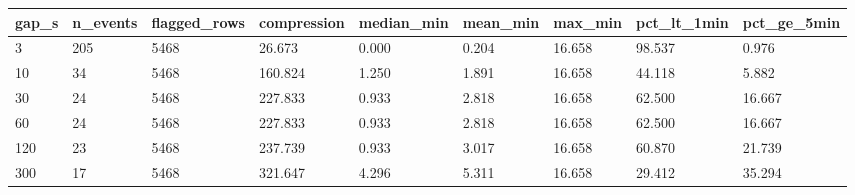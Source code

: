 \begin{tabular}{lllllllll}
\toprule
gap\_s & n\_events & flagged\_rows & compression & median\_min & mean\_min & max\_min & pct\_lt\_1min & pct\_ge\_5min \\
\midrule
3 & 205 & 5468 & 26.673 & 0.000 & 0.204 & 16.658 & 98.537 & 0.976 \\
10 & 34 & 5468 & 160.824 & 1.250 & 1.891 & 16.658 & 44.118 & 5.882 \\
30 & 24 & 5468 & 227.833 & 0.933 & 2.818 & 16.658 & 62.500 & 16.667 \\
60 & 24 & 5468 & 227.833 & 0.933 & 2.818 & 16.658 & 62.500 & 16.667 \\
120 & 23 & 5468 & 237.739 & 0.933 & 3.017 & 16.658 & 60.870 & 21.739 \\
300 & 17 & 5468 & 321.647 & 4.296 & 5.311 & 16.658 & 29.412 & 35.294 \\
\bottomrule
\end{tabular}
